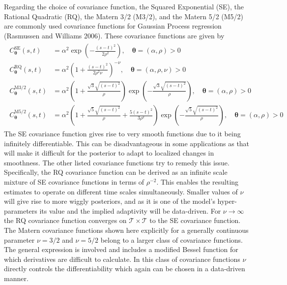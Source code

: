 \documentclass[
  11pt,
]{article}
\theoremstyle{nonumberplain}
\begin{document}
Regarding the choice of covariance function, the Squared Exponential
(SE), the Rational Quadratic (RQ), the Matern 3/2 (M3/2), and the Matern
5/2 (M5/2) are commonly used covariance functions for Gaussian Process
regression (Rasmussen and Williams 2006). These covariance functions are
given by \begin{align}
\begin{split}
  C_{\bm{\theta}}^\text{SE}(s, t) &= \alpha^2\exp\left(-\frac{(s-t)^2}{2\rho^2}\right), \quad \bm{\theta} = (\alpha, \rho) > 0\\ 
  C_{\bm{\theta}}^\text{RQ}(s, t) &= \alpha^2\left(1 + \frac{(s-t)^2}{2\rho^2\nu}\right)^{-\nu}, \quad \bm{\theta} = (\alpha, \rho, \nu) > 0\\
  C_{\bm{\theta}}^\text{M3/2}(s, t) &= \alpha^2\left(1 + \frac{\sqrt{3}\sqrt{(s-t)^2}}{\rho}\right)\exp\left(-\frac{\sqrt{3}\sqrt{(s-t)^2}}{\rho}\right), \quad \bm{\theta} = (\alpha, \rho) > 0\\
  C_{\bm{\theta}}^\text{M5/2}(s, t) &= \alpha^2\left(1 + \frac{\sqrt{5}\sqrt{(s-t)^2}}{\rho} + \frac{5(s-t)^2}{3\rho^2}\right)\exp\left(-\frac{\sqrt{5}\sqrt{(s-t)^2}}{\rho}\right), \quad \bm{\theta} = (\alpha, \rho)  > 0
\end{split}
\label{eq:covariancefunctions}
\end{align} The SE covariance function gives rise to very smooth
functions due to it being infinitely differentiable. This can be
disadvantageous in some applications as that will make it difficult for
the posterior to adapt to localized changes in smoothness. The other
listed covariance functions try to remedy this issue. Specifically, the
RQ covariance function can be derived as an infinite scale mixture of SE
covariance functions in terms of \(\rho^{-2}\). This enables the
resulting estimates to operate on different time scales simultaneously.
Smaller values of \(\nu\) will give rise to more wiggly posteriors, and
as it is one of the model's hyper-parameters its value and the implied
adaptivity will be data-driven. For \(\nu \rightarrow \infty\) the RQ
covariance function converges on \(\mathcal{T} \times \mathcal{T}\) to
the SE covariance function. The Matern covariance functions shown here
explicitly for a generally continuous parameter \(\nu = 3/2\) and
\(\nu = 5/2\) belong to a larger class of covariance functions. The
general expression is involved and includes a modified Bessel function
for which derivatives are difficult to calculate. In this class of
covariance functions \(\nu\) directly controls the differentiability
which again can be chosen in a data-driven manner.
\end{document}
